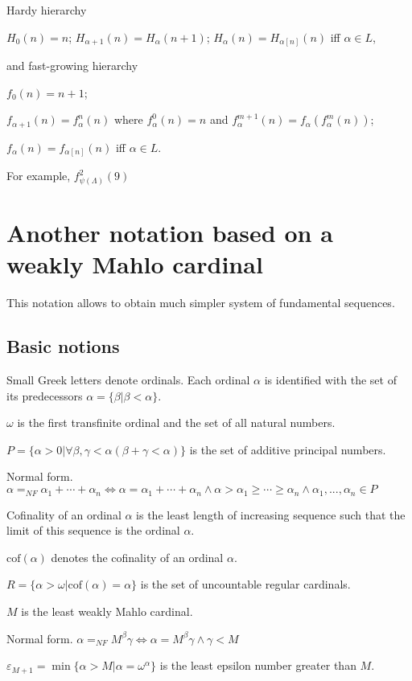\documentclass[10pt]{article}
\begin{document}
Hardy hierarchy

\(H_0(n)=n\);  \(H_{\alpha+1}(n)=H_\alpha(n+1)\);  \(H_\alpha(n)=H_{\alpha[n]}(n)\) iff \(\alpha\in L\),

and fast-growing hierarchy

\(f_0(n)=n+1\);  

\(f_{\alpha+1}(n)=f_\alpha^n(n)\) where \(f_\alpha^0(n)=n\) and \(f_\alpha^{m+1}(n)=f_\alpha(f_\alpha^m(n))\);  

\(f_\alpha(n)=f_{\alpha[n]}(n)\) iff \(\alpha\in L\).

For example, \(f_{\psi(\Lambda)}^2(9)\)

\section{Another notation based on a weakly Mahlo cardinal}

This notation allows to obtain much simpler system of fundamental sequences.

\subsection{Basic notions}

Small Greek letters denote ordinals. Each ordinal \(\alpha\) is identified with the set of its predecessors \(\alpha=\{\beta|\beta<\alpha\}\). 

\(\omega\) is the first transfinite ordinal and the set of all natural numbers.

\(P=\{\alpha>0|\forall\beta,\gamma<\alpha(\beta+\gamma<\alpha)\}\) is the  set of additive principal numbers.

Normal form. \(\alpha=_{NF}\alpha_1+\cdots+\alpha_n\Leftrightarrow\alpha=\alpha_1+\cdots+\alpha_n\wedge\alpha>\alpha_1\geq\cdots\geq\alpha_n\wedge\alpha_1,...,\alpha_n\in P\)

Cofinality of an ordinal \(\alpha\) is the least length of increasing sequence such that the limit of this sequence is the ordinal \(\alpha\). 

\(\text{cof}(\alpha)\) denotes the cofinality of an ordinal \(\alpha\).

\(R=\{\alpha>\omega|\text{cof}(\alpha)=\alpha\}\) is the set of uncountable regular cardinals.

\(M\) is the least weakly Mahlo cardinal. 

Normal form. \(\alpha=_{NF}M^\beta\gamma\Leftrightarrow\alpha=M^\beta\gamma\wedge\gamma<M\)

\(\varepsilon_{M+1}=\min\{\alpha>M|\alpha=\omega^\alpha\}\) is the least epsilon number greater than \(M\). 
\end{document}
